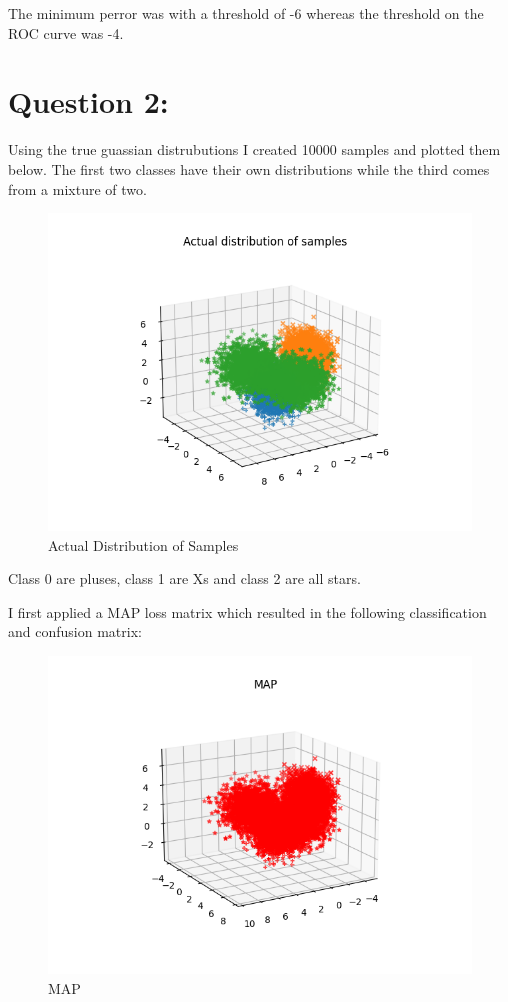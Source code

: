 \documentclass[11pt]{article}
\begin{document}
The minimum perror was with a threshold of -6 whereas the threshold on the ROC curve was -4.

\section*{Question 2:}
Using the true guassian distrubutions I created 10000 samples and plotted them below.
The first two classes have their own distributions while the third comes from a mixture of two.
\begin{figure}[H]
	\centering
	\includegraphics[width=\textwidth]{3gactual}
	\caption{Actual Distribution of Samples}
\end{figure}

Class 0 are pluses, class 1 are Xs and class 2 are all stars.

I first applied a MAP loss matrix which resulted in the following classification and confusion matrix:

\begin{figure}[H]
	\centering
	\includegraphics[width=\textwidth]{3gmap}
	\caption{MAP}
\end{figure}
\end{document}
